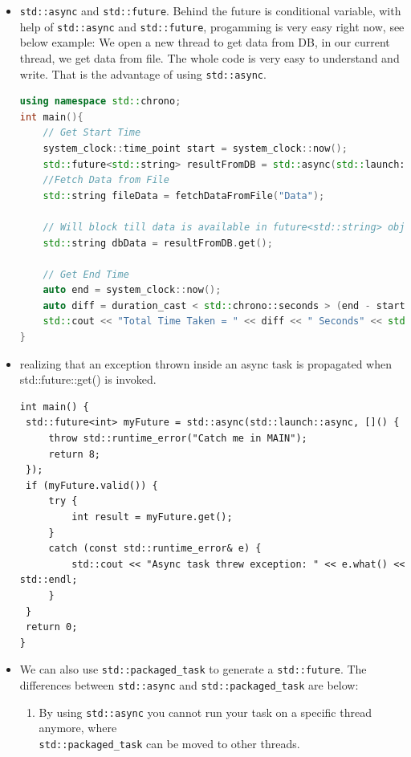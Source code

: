 \documentclass[a4paper,11pt,twoside]{book}
\begin{document}
\begin{itemize}
	\item \texttt{std::async} and \texttt{std::future}. Behind the future is conditional variable, with help of \texttt{std::async} and \texttt{std::future}, progamming is very easy right now, see below example: We open a new thread to get data from DB, in our current thread, we get data from file. The whole code is very easy to understand and write. That is the advantage of using \texttt{std::async}.
	
\begin{lstlisting}[frame=single, language=c++]
using namespace std::chrono;
int main(){
	// Get Start Time
	system_clock::time_point start = system_clock::now();
	std::future<std::string> resultFromDB = std::async(std::launch::async, fetchDataFromDB, "Data");
	//Fetch Data from File
	std::string fileData = fetchDataFromFile("Data");
	
	// Will block till data is available in future<std::string> object.
	std::string dbData = resultFromDB.get();
	
	// Get End Time
	auto end = system_clock::now();
	auto diff = duration_cast < std::chrono::seconds > (end - start).count();
	std::cout << "Total Time Taken = " << diff << " Seconds" << std::endl;
}
\end{lstlisting}	

    \item realizing that an exception thrown inside an async task is propagated when std::future::get() is invoked.

\begin{lstlisting}[]
int main() {
 std::future<int> myFuture = std::async(std::launch::async, []() {
     throw std::runtime_error("Catch me in MAIN");
     return 8;
 });
 if (myFuture.valid()) {
     try {
         int result = myFuture.get();
     }
     catch (const std::runtime_error& e) {
         std::cout << "Async task threw exception: " << e.what() << std::endl;
     }
 }
 return 0;
}
\end{lstlisting}
\item We can also use \texttt{std::packaged\_task} to generate a \texttt{std::future}. The differences between \texttt{std::async} and \texttt{std::packaged\_task} are below:

\begin{enumerate}
	\item By using \texttt{std::async} you cannot run your task on a specific thread anymore, where \\ \texttt{std::packaged\_task} can be moved to other threads.
	

\end{enumerate}
\end{itemize}
\end{document}
